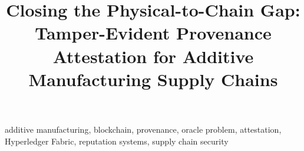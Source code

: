 \documentclass[conference]{IEEEtran}
\begin{document}
\title{Closing the Physical-to-Chain Gap: Tamper-Evident Provenance
Attestation for Additive Manufacturing Supply Chains}

\author{%
}

\maketitle

\begin{abstract}

\end{abstract}

\begin{IEEEkeywords}
additive manufacturing, blockchain, provenance, oracle problem, attestation,
Hyperledger Fabric, reputation systems, supply chain security
\end{IEEEkeywords}











\balance


\end{document}
